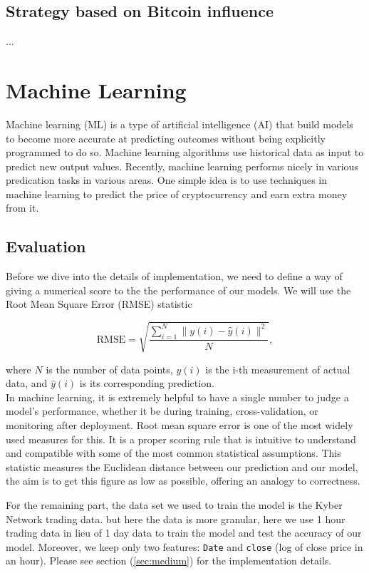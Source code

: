 \documentclass[twoside]{report}
\newcommand{\code}{\texttt}
\begin{document}
\begin{spacing}{1}
\subsection{Strategy based on Bitcoin influence}

...

\section{Machine Learning}
Machine learning (ML) is a type of artificial intelligence (AI) that build models to become more accurate at predicting outcomes without being explicitly programmed to do so. Machine learning algorithms use historical data as input to predict new output values. Recently, machine learning performs nicely in various predication tasks in various areas. One simple idea is to use techniques in machine learning to predict the price of cryptocurrency and earn extra money from it.

\subsection{Evaluation}
Before we dive into the details of implementation, we need to define a way of giving a numerical score to the the performance of our models. We will use the Root Mean Square Error (RMSE) statistic

\[
\textrm{RMSE} =\sqrt{\frac{\sum_{i=1}^{N}\|y(i)-\hat{y}(i)\|^{2}}{N}},
\]

where $N$ is the number of data points, $y(i)$ is the i-th measurement of actual data, and $\hat{y}(i)$ is its corresponding prediction.\\

In machine learning, it is extremely helpful to have a single number to judge a model’s performance, whether it be during training, cross-validation, or monitoring after deployment. Root mean square error is one of the most widely used measures for this. It is a proper scoring rule that is intuitive to understand and compatible with some of the most common statistical assumptions. \cite{hyndman2006another} This statistic measures the Euclidean distance between our prediction and our model, the aim is to get this figure as low as possible, offering an analogy to correctness.  

For the remaining part, the data set we used to train the model is the Kyber Network trading data. but here the data is more granular, here we use 1 hour trading data in lieu of 1 day data to train the model and test the accuracy of our model. Moreover, we keep only two features: \code{Date} and \code{close} (log of close price in an hour). Please see section (\ref{sec:medium}) for the implementation details.


\end{spacing}
\end{document}
